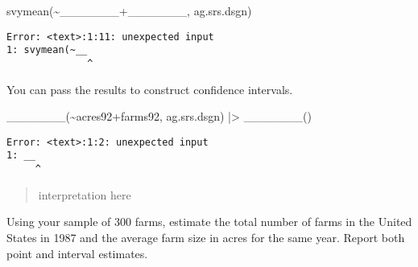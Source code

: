 \documentclass[
  letterpaper,
  DIV=11,
  numbers=noendperiod]{scrartcl}
\newenvironment{Shaded}{}{}
\newcommand{\FunctionTok}[1]{\textcolor[rgb]{0.44,0.26,0.76}{#1}}
\newcommand{\NormalTok}[1]{\textcolor[rgb]{0.14,0.16,0.18}{#1}}
\newcommand{\SpecialCharTok}[1]{\textcolor[rgb]{0.00,0.36,0.77}{#1}}
\begin{document}
\begin{Shaded}
\begin{Highlighting}[]
\FunctionTok{svymean}\NormalTok{(}\SpecialCharTok{\textasciitilde{}}\NormalTok{\_\_\_\_\_\_\_}\SpecialCharTok{+}\NormalTok{\_\_\_\_\_\_\_, ag.srs.dsgn)}
\end{Highlighting}
\end{Shaded}

\begin{verbatim}
Error: <text>:1:11: unexpected input
1: svymean(~__
              ^
\end{verbatim}

You can pass the results to construct confidence intervals.

\begin{Shaded}
\begin{Highlighting}[]
\FunctionTok{\_\_\_\_\_\_\_}\NormalTok{(}\SpecialCharTok{\textasciitilde{}}\NormalTok{acres92}\SpecialCharTok{+}\NormalTok{farms92, ag.srs.dsgn) }\SpecialCharTok{|\textgreater{}} \FunctionTok{\_\_\_\_\_\_\_}\NormalTok{()}
\end{Highlighting}
\end{Shaded}

\begin{verbatim}
Error: <text>:1:2: unexpected input
1: __
     ^
\end{verbatim}

\begin{quote}
interpretation here
\end{quote}

\begin{tcolorbox}[enhanced jigsaw, toptitle=1mm, breakable, colframe=quarto-callout-warning-color-frame, colbacktitle=quarto-callout-warning-color!10!white, left=2mm, titlerule=0mm, bottomtitle=1mm, title={You try it}, bottomrule=.15mm, rightrule=.15mm, arc=.35mm, toprule=.15mm, colback=white, opacityback=0, leftrule=.75mm, coltitle=black, opacitybacktitle=0.6]

Using your sample of 300 farms, estimate the total number of farms in
the United States in 1987 and the average farm size in acres for the
same year. Report both point and interval estimates.

\end{tcolorbox}
\end{document}
